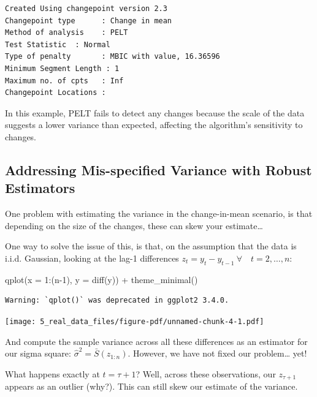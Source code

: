 \documentclass[
  letterpaper,
  DIV=11,
  numbers=noendperiod]{scrreprt}
\newenvironment{Shaded}{\begin{snugshade}}{\end{snugshade}}
\newcommand{\AttributeTok}[1]{\textcolor[rgb]{0.40,0.45,0.13}{#1}}
\newcommand{\DecValTok}[1]{\textcolor[rgb]{0.68,0.00,0.00}{#1}}
\newcommand{\FunctionTok}[1]{\textcolor[rgb]{0.28,0.35,0.67}{#1}}
\newcommand{\NormalTok}[1]{\textcolor[rgb]{0.00,0.23,0.31}{#1}}
\newcommand{\SpecialCharTok}[1]{\textcolor[rgb]{0.37,0.37,0.37}{#1}}
\begin{document}
\begin{verbatim}
Created Using changepoint version 2.3 
Changepoint type      : Change in mean 
Method of analysis    : PELT 
Test Statistic  : Normal 
Type of penalty       : MBIC with value, 16.36596 
Minimum Segment Length : 1 
Maximum no. of cpts   : Inf 
Changepoint Locations :  
\end{verbatim}

In this example, PELT fails to detect any changes because the scale of
the data suggests a lower variance than expected, affecting the
algorithm's sensitivity to changes.

\subsection{Addressing Mis-specified Variance with Robust
Estimators}\label{addressing-mis-specified-variance-with-robust-estimators}

One problem with estimating the variance in the change-in-mean scenario,
is that depending on the size of the changes, these can skew your
estimate\ldots{}

One way to solve the issue of this, is that, on the assumption that the
data is i.i.d. Gaussian, looking at the lag-1 differences
\(z_t =  y_t - y_{t-1} \ \forall \quad t = 2, \dots, n\):

\begin{Shaded}
\begin{Highlighting}[]
\FunctionTok{qplot}\NormalTok{(}\AttributeTok{x =} \DecValTok{1}\SpecialCharTok{:}\NormalTok{(n}\DecValTok{{-}1}\NormalTok{), }\AttributeTok{y =} \FunctionTok{diff}\NormalTok{(y)) }\SpecialCharTok{+} \FunctionTok{theme\_minimal}\NormalTok{()}
\end{Highlighting}
\end{Shaded}

\begin{verbatim}
Warning: `qplot()` was deprecated in ggplot2 3.4.0.
\end{verbatim}

\texttt{[image: 5\_real\_data\_files/figure-pdf/unnamed-chunk-4-1.pdf]}

And compute the sample variance across all these differences as an
estimator for our sigma square: \(\hat \sigma^2 = \bar S(z_{1:n})\).
However, we have not fixed our problem\ldots{} yet!

What happens exactly at \(t = \tau +1\)? Well, across these
observations, our \(z_{\tau + 1}\) appears as an outlier (why?). This
can still skew our estimate of the variance.
\end{document}
